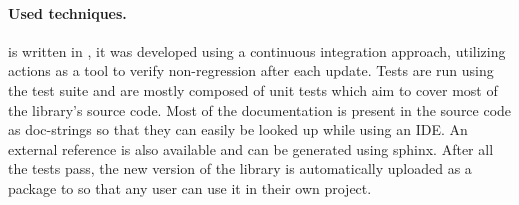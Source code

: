 \paragraph*{Used techniques.}
\pyvmt{} is written in \python{}, it was developed using a continuous integration approach, utilizing \github{} actions as a tool to verify non-regression after each update.
Tests are run using the \pytest{} test suite and are mostly composed of unit tests which aim to cover most of the library's source code.
Most of the documentation is present in the source code as doc-strings so that they can easily be looked up while using an IDE. An external reference is also available and can be generated using sphinx.
After all the tests pass, the new version of the library is automatically uploaded as a package to \pypi{} so that any user can use it in their own project.


